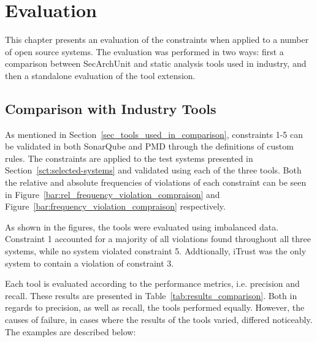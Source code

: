 \chapter{Evaluation}

This chapter presents an evaluation of the constraints when applied to a number of open source systems. The evaluation was performed in two ways: first a comparison between SecArchUnit and static analysis tools used in industry, and then a standalone evaluation of the tool extension.

\section{Comparison with Industry Tools}
As mentioned in Section~\ref{sec_tools_used_in_comparison}, constraints 1-5 can be validated in both SonarQube and PMD through the definitions of custom rules. The constraints are applied to the test systems presented in Section~\ref{sct:selected-systems} and validated using each of the three tools. Both the relative and absolute frequencies of violations of each constraint can be seen in Figure~\ref{bar:rel_frequency_violation_compraison} and Figure~\ref{bar:frequency_violation_compraison} respectively.




As shown in the figures, the tools were evaluated using imbalanced data. Constraint 1 accounted for a majority of all violations found throughout all three systems, while no system violated constraint 5. Addtionally, iTrust was the only system to contain a violation of constraint 3. 

Each tool is evaluated according to the performance metrics, i.e. precision and recall. These results are presented in Table~\ref{tab:results_comparison}. Both in regards to precision, as well as recall, the tools performed equally. However, the causes of failure, in cases where the results of the tools varied, differed noticeably. The examples are described below:

